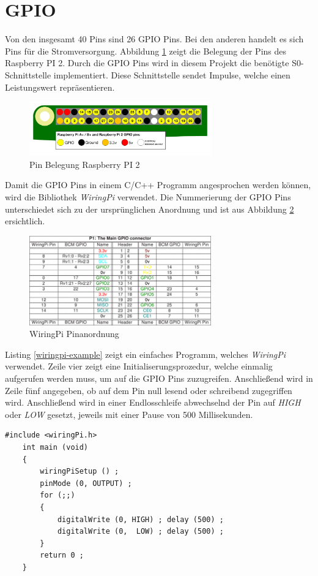 \section{GPIO}\label{gpio}
Von den insgesamt 40 Pins sind 26 GPIO Pins. Bei den anderen handelt es sich Pins für die Stromversorgung. Abbildung \ref{gpio-pins} zeigt die Belegung der Pins des Raspberry PI 2. Durch die GPIO Pins wird in diesem Projekt die benötigte S0-Schnittstelle implementiert. Diese Schnittstelle sendet Impulse, welche einen Leistungswert repräsentieren.
\begin{figure}[H]
	\centering
	\includegraphics[width=0.7\textwidth]{bilder/gpio-pins.png}
	\caption{Pin Belegung Raspberry PI 2}
	\label{gpio-pins}
\end{figure}
\noindent
Damit die GPIO Pins in einem C/C++ Programm angesprochen werden können, wird die Bibliothek \textit{WiringPi} verwendet. %
Die Nummerierung der GPIO Pins unterschiedet sich zu der ursprünglichen Anordnung und ist aus Abbildung \ref{wiringpi} ersichtlich.
 \begin{figure}[H]
 	\centering
 	\includegraphics[width=0.7\textwidth]{bilder/wiringpi.png}
 	\caption{WiringPi Pinanordnung}
 	\label{wiringpi}
 \end{figure}
\noindent
Listing \ref{wiringpi-example} zeigt ein einfaches Programm, welches \textit{WiringPi} verwendet. Zeile vier zeigt eine Initialiserungsprozedur, welche einmalig aufgerufen werden muss, um auf die GPIO Pins zuzugreifen. Anschließend wird in Zeile fünf angegeben, ob auf dem Pin null lesend oder schreibend zugegriffen wird. Anschließend wird in einer Endlosschleife abwechselnd der Pin auf \textit{HIGH} oder \textit{LOW} gesetzt, jeweils mit einer Pause von 500 Millisekunden.
\begin{lstlisting}[frame=single, basicstyle=\tiny, caption=WiringPi Beispiel, label=wiringpi-example]
	#include <wiringPi.h>
	int main (void)
	{
		wiringPiSetup () ;
		pinMode (0, OUTPUT) ;
		for (;;)
		{
			digitalWrite (0, HIGH) ; delay (500) ;
			digitalWrite (0,  LOW) ; delay (500) ;
		}
		return 0 ;
	}
\end{lstlisting}
